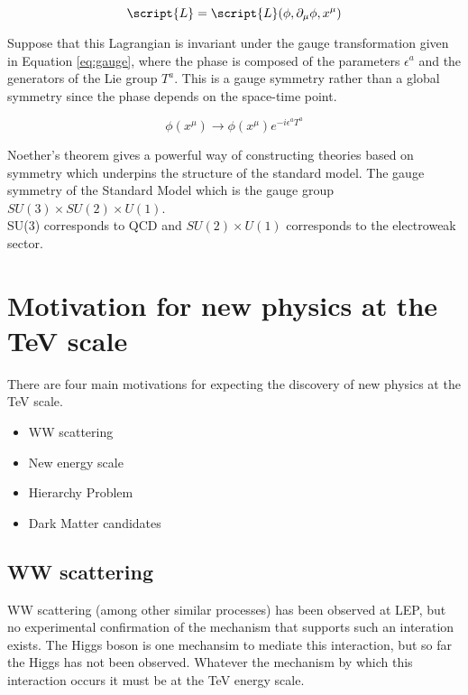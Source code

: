 \begin{equation}
\script{L} = \script{L}(\phi, \partial_{\mu}\phi, x^{\mu})
\label{eq:lagrangian}
\end{equation}

Suppose that this Lagrangian is invariant under the gauge transformation given
in Equation \ref{eq:gauge}, where the phase is composed of the parameters 
$\epsilon^{a}$ and the generators of the Lie group $T^{a}$. This is a gauge
symmetry rather than a global symmetry since the phase depends on the space-time
point. 

\begin{equation} 
\phi(x^{\mu})\rightarrow \phi(x^{\mu})e^{-i\epsilon^{a}T^{a}}
\label{eq:gauge}
\end{equation}

Noether's theorem gives a powerful way of constructing theories based on 
symmetry which underpins the structure of the standard model. The gauge
symmetry of the Standard Model which is the gauge group $SU(3)\times 
SU(2)\times U(1)$. \\

SU(3) corresponds to QCD and $SU(2)\times U(1)$ corresponds to the electroweak
sector. \\



\section{Motivation for new physics at the TeV scale}

There are four main motivations for expecting the discovery of new physics at 
the TeV scale.

\begin{itemize}
\item WW scattering
\item New energy scale
\item Hierarchy Problem
\item Dark Matter candidates
\end{itemize}

\subsection{WW scattering}

WW scattering (among other similar processes) has been observed at LEP, but
no experimental confirmation of the mechanism that supports such an interation
exists. The Higgs boson is one mechansim to mediate this interaction, but so far
the Higgs has not been observed. Whatever the mechanism by which this
interaction occurs it must be at the TeV energy scale. \\

